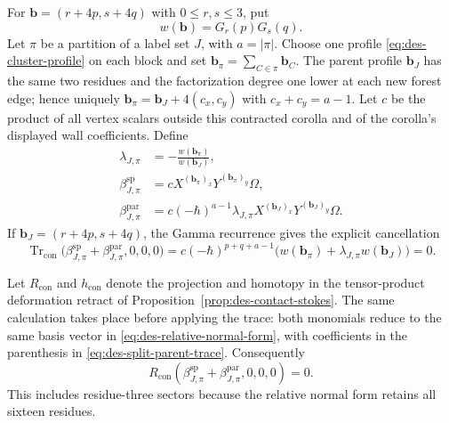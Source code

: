 For $\mathbf b=(r+4p,s+4q)$ with $0\leq r,s\leq3$, put
\begin{equation}
 w(\mathbf b)=G_r(p)G_s(q).
 \label{eq:des-contact-weight}
\end{equation}
Let $\pi$ be a partition of a label set $J$, with $a=|\pi|$.  Choose one
profile \eqref{eq:des-cluster-profile} on each block and set
$\mathbf b_\pi=\sum_{C\in\pi}\mathbf b_C$.  The parent profile
$\mathbf b_J$ has the same two residues and the factorization degree one
lower at each new forest edge; hence uniquely
$\mathbf b_\pi=\mathbf b_J+4(c_x,c_y)$ with
$c_x+c_y=a-1$.  Let $c$ be the product of all vertex scalars outside this
contracted corolla and of the corolla's displayed wall coefficients.  Define
\begin{equation}
\begin{aligned}
 \lambda_{J,\pi}&=-\frac{w(\mathbf b_\pi)}{w(\mathbf b_J)},\\
 \beta^{\mathrm{sp}}_{J,\pi}
   &=cX^{(\mathbf b_\pi)_x}Y^{(\mathbf b_\pi)_y}\Omega,\\
 \beta^{\mathrm{par}}_{J,\pi}
   &=c(-\hbar)^{a-1}\lambda_{J,\pi}
     X^{(\mathbf b_J)_x}Y^{(\mathbf b_J)_y}\Omega.
\end{aligned}
 \label{eq:des-split-parent-seeds}
\end{equation}
If $\mathbf b_J=(r+4p,s+4q)$, the Gamma recurrence gives the explicit
cancellation
\begin{equation}
 \operatorname{Tr}_{\mathrm{con}}
 \bigl(\beta^{\mathrm{sp}}_{J,\pi}
      +\beta^{\mathrm{par}}_{J,\pi},0,0,0\bigr)
 =c(-\hbar)^{p+q+a-1}
 \bigl(w(\mathbf b_\pi)+\lambda_{J,\pi}w(\mathbf b_J)\bigr)=0.
 \label{eq:des-split-parent-trace}
\end{equation}

Let $R_{\mathrm{con}}$ and $h_{\mathrm{con}}$ denote the projection and
homotopy in the tensor-product deformation retract of
Proposition~\ref{prop:des-contact-stokes}.  The same calculation takes place
before applying the trace: both monomials reduce to the same basis vector in
\eqref{eq:des-relative-normal-form}, with coefficients in the parenthesis in
\eqref{eq:des-split-parent-trace}.  Consequently
\begin{equation}
 R_{\mathrm{con}}
 (\beta^{\mathrm{sp}}_{J,\pi}+\beta^{\mathrm{par}}_{J,\pi},0,0,0)=0.
 \label{eq:des-split-parent-projection}
\end{equation}
This includes residue-three sectors because the relative normal form retains
all sixteen residues.

